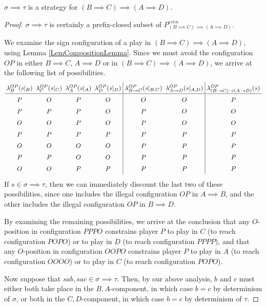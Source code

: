 \begin{proposition}
  $\sigma\implies\tau$ is a strategy for $(B\implies C) \implies (A \implies D)$.
  \label{PropImpliesWellDefined}
\end{proposition}
\begin{proof}
  $\sigma\implies\tau$ is certainly a prefix-closed subset of $P_{(B\implies C)\implies (A \implies D)}^{\textit{even}}$.
  
  We examine the sign configuration of a play in $(B\implies C)\implies (A\implies D)$, using Lemma \ref{LemCompositionLemma}.  
  Since we must avoid the configuration $OP$ in either $B\implies C$, $A\implies D$ or in $(B\implies C)\implies (A\implies D)$, we arrive at the following list of possibilities.
  \scriptsize
  \[
\arraycolsep=2.6pt\def\arraystretch{1.5}
    \begin{array}{cccc|cc|c}
      \lambda_B^{OP}(s\vert_B) & \lambda_C^{OP}(s\vert_C) & \lambda_A^{OP}(s\vert_A) & \lambda_D^{OP}(s\vert_D) & \lambda_{B\implies C}^{OP}(s\vert_{B,C}) & \lambda_{A\implies D}^{OP}(s\vert_{A,D}) & \lambda_{(B\implies C)\implies (A\implies D)}^{OP}(s) \\
      \hline
      P & O & P & O & O & O & P \\
      P & P & P & O & P & O & O \\
      O & O & P & O & P & O & O \\
      P & P & P & P & P & P & P \\
      O & O & O & O & P & P & P \\
      P & P & O & O & P & P & P \\
      O & O & P & P & P & P & P
    \end{array}
    \]
  \normalsize
  If $s\in\sigma\implies\tau$, then we can immediately discount the last two of these possibilities, since one includes the illegal configuration $OP$ in $A\implies B$, and the other includes the illegal configuration $OP$ in $B\implies D$.

  By examining the remaining possibilities, we arrive at the conclusion that any $O$-position in configuration $PPPO$ constrains player $P$ to play in $C$ (to reach configuration $POPO$) or to play in $D$ (to reach configuration $PPPP$), and that any $O$-position in configuration $OOPO$ constrains player $P$ to play in $A$ (to reach configuration $OOOO$) or to play in $C$ (to reach configuration $POPO$).  

  Now suppose that $sab,sac\in\sigma\implies\tau$.  
  Then, by our above analysis, $b$ and $c$ must either both take place in the $B,A$-component, in which case $b = c$ by determinism of $\sigma$, or both in the $C,D$-component, in which case $b = c$ by determinism of $\tau$.  
\end{proof}

